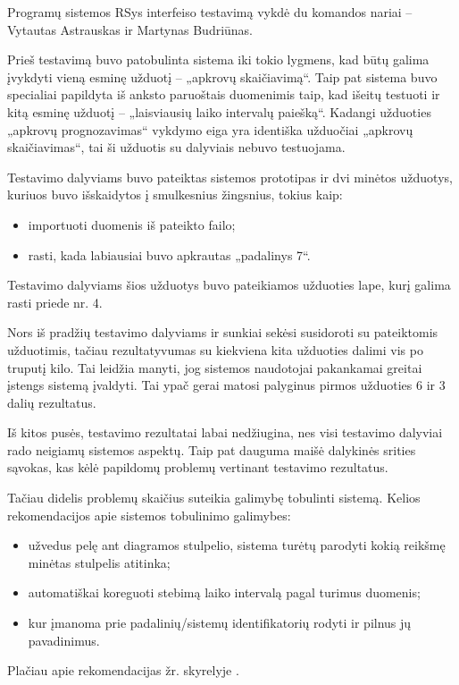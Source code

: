Programų sistemos RSys interfeiso testavimą vykdė du komandos nariai –
Vytautas Astrauskas ir Martynas Budriūnas.

Prieš testavimą buvo patobulinta sistema iki tokio lygmens, kad būtų galima
įvykdyti vieną esminę užduotį – „apkrovų skaičiavimą“.
Taip pat sistema buvo specialiai papildyta iš anksto paruoštais
duomenimis taip, kad išeitų testuoti ir kitą esminę užduotį –
„laisviausių laiko intervalų paiešką“. Kadangi užduoties
„apkrovų prognozavimas“ vykdymo eiga yra identiška užduočiai
„apkrovų skaičiavimas“, tai ši užduotis su dalyviais nebuvo
testuojama.

Testavimo dalyviams buvo pateiktas sistemos prototipas ir dvi minėtos
užduotys, kuriuos buvo išskaidytos į smulkesnius žingsnius, tokius
kaip:
\begin{itemize}
  \item importuoti duomenis iš pateikto failo;
  \item rasti, kada labiausiai buvo apkrautas „padalinys 7“.
\end{itemize}

Testavimo dalyviams šios užduotys buvo pateikiamos užduoties lape,
kurį galima rasti priede nr. 4.

Nors iš pradžių testavimo dalyviams ir sunkiai sekėsi susidoroti su
pateiktomis užduotimis, tačiau rezultatyvumas su kiekviena kita
užduoties dalimi vis po truputį kilo. Tai leidžia manyti, jog sistemos
naudotojai pakankamai greitai įstengs sistemą įvaldyti. Tai ypač gerai
matosi palyginus pirmos užduoties 6 ir 3 dalių rezultatus.

Iš kitos pusės, testavimo rezultatai labai nedžiugina, nes visi
testavimo dalyviai rado neigiamų sistemos aspektų. Taip pat dauguma
maišė dalykinės srities sąvokas, kas kėlė papildomų problemų
vertinant testavimo rezultatus.

Tačiau didelis problemų skaičius suteikia galimybę tobulinti sistemą. Kelios
rekomendacijos apie sistemos tobulinimo galimybes:
\begin{itemize}
  \item užvedus pelę ant diagramos stulpelio, sistema turėtų parodyti kokią
  	reikšmę minėtas stulpelis atitinka;
  \item automatiškai koreguoti stebimą laiko intervalą pagal turimus
    duomenis;
  \item kur įmanoma prie padalinių/sistemų identifikatorių rodyti
    ir pilnus jų pavadinimus.
\end{itemize}

Plačiau apie rekomendacijas žr. skyrelyje
.

